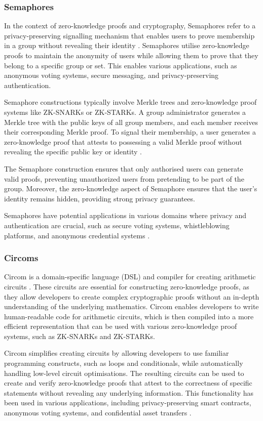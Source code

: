 \subsubsection{Semaphores}
In the context of zero-knowledge proofs and cryptography, Semaphores refer to a privacy-preserving signalling mechanism that enables users to prove membership in a group without revealing their identity \cite{bunz2018bulletproofs}. Semaphores utilise zero-knowledge proofs to maintain the anonymity of users while allowing them to prove that they belong to a specific group or set. This enables various applications, such as anonymous voting systems, secure messaging, and privacy-preserving authentication.

Semaphore constructions typically involve Merkle trees and zero-knowledge proof systems like ZK-SNARKs or ZK-STARKs. A group administrator generates a Merkle tree with the public keys of all group members, and each member receives their corresponding Merkle proof. To signal their membership, a user generates a zero-knowledge proof that attests to possessing a valid Merkle proof without revealing the specific public key or identity \cite{idrees2019zkay}.

The Semaphore construction ensures that only authorised users can generate valid proofs, preventing unauthorized users from pretending to be part of the group. Moreover, the zero-knowledge aspect of Semaphore ensures that the user's identity remains hidden, providing strong privacy guarantees.

Semaphores have potential applications in various domains where privacy and authentication are crucial, such as secure voting systems, whistleblowing platforms, and anonymous credential systems \cite{benarroch2020improved}.

\subsubsection{Circoms}
Circom is a domain-specific language (DSL) and compiler for creating arithmetic circuits \cite{jorda2019circom}. These circuits are essential for constructing zero-knowledge proofs, as they allow developers to create complex cryptographic proofs without an in-depth understanding of the underlying mathematics. Circom enables developers to write human-readable code for arithmetic circuits, which is then compiled into a more efficient representation that can be used with various zero-knowledge proof systems, such as ZK-SNARKs and ZK-STARKs.

Circom simplifies creating circuits by allowing developers to use familiar programming constructs, such as loops and conditionals, while automatically handling low-level circuit optimisations. The resulting circuits can be used to create and verify zero-knowledge proofs that attest to the correctness of specific statements without revealing any underlying information. This functionality has been used in various applications, including privacy-preserving smart contracts, anonymous voting systems, and confidential asset transfers \cite{maller2019sonic2}.

